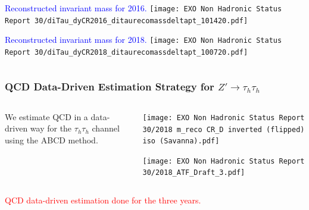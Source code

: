 \documentclass[8pt,xcolor=dvipsnames,xcolor=table]{beamer}
\begin{document}
\begin{frame}
\begin{columns}
\begin{column}{.5\textwidth}
\textcolor{blue}{Reconstructed invariant mass for 2016.}
\centering
\texttt{[image: EXO Non Hadronic Status Report 30/diTau\_dyCR2016\_ditaurecomassdeltapt\_101420.pdf]}
            

\textcolor{blue}{Reconstructed invariant mass for 2018.}
\texttt{[image: EXO Non Hadronic Status Report 30/diTau\_dyCR2018\_ditaurecomassdeltapt\_100720.pdf]}

    \end{column}
\end{columns}
 

\end{frame}
\begin{frame}
\frametitle{QCD Data-Driven Estimation Strategy for $Z'\rightarrow\tau_h\tau_h$}

\begin{columns}
    \begin{column}{.45\textwidth}
We estimate QCD in a  data-driven way for the $\tau_h\tau_h$ channel using the ABCD method.

\end{column}


      \begin{column}{.5\textwidth}

\centering
            

\texttt{[image: EXO Non Hadronic Status Report 30/2018 m\_reco CR\_D inverted (flipped) iso (Savanna).pdf]}

\texttt{[image: EXO Non Hadronic Status Report 30/2018\_ATF\_Draft\_3.pdf]}

    \end{column}
    
  \end{columns}
\centering
\item \textcolor{red}{QCD data-driven estimation done for the three years.}  

\end{frame}
\end{document}
